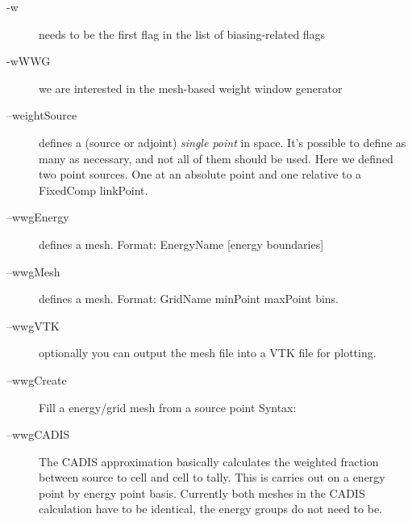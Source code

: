 \begin{description}
\item[-w] needs to be the first flag in the list of biasing-related flags
\item[-wWWG] we are interested in the mesh-based weight window generator
\item[--weightSource] defines a (source or adjoint) {\em single point} in space. It's possible to define as many as necessary, and not all of them should be used.
  Here we defined two point sources. One at an absolute point and one relative to a FixedComp linkPoint.
\item[--wwgEnergy] defines a mesh. Format: EnergyName [energy boundaries]
\item[--wwgMesh] defines a mesh. Format: GridName minPoint maxPoint bins.
\item[--wwgVTK] optionally you can output the mesh file into a VTK file for plotting.
\item[--wwgCreate] Fill a energy/grid mesh  from a source point
  Syntax:

\item[--wwgCADIS] The CADIS approximation basically calculates the weighted
  fraction between source to cell and cell to tally. This is carries out on
  a energy point by energy point basis. Currently both meshes in the CADIS
  calculation have to be identical, the energy groups do not need to be.


\end{description}
